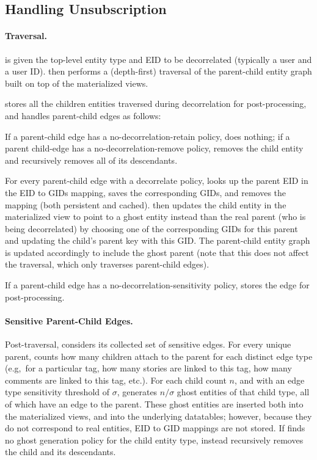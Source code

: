 \subsection{Handling Unsubscription}
\paragraph{Traversal.}
\sys{} is given the top-level entity type and EID to be decorrelated (typically a user and a user ID).
\sys{} then performs a (depth-first) traversal of the parent-child entity graph built on top of the materialized
views. 

\sys{} stores all the children entities traversed during decorrelation for post-processing, and
handles parent-child edges as follows:

If a parent-child edge has a no-decorrelation-retain policy, \sys{} does nothing; if a parent child-edge has a
no-decorrelation-remove policy, \sys{} removes the child entity and recursively removes all of its
descendants. 

For every parent-child edge with a decorrelate policy, \sys{} looks up the parent EID in the
EID to GIDs mapping, saves the corresponding GIDs, and removes the mapping (both persistent and
cached).
\sys{} then updates the child entity in the materialized view to point to a ghost entity instead
than the real parent (who is being decorrelated) by choosing one of the corresponding GIDs for this
parent and updating the child's parent key with this GID.  The parent-child entity graph is updated
accordingly to include the ghost parent (note that this does not affect the traversal, which only
traverses parent-child edges).

If a parent-child edge has a no-decorrelation-sensitivity policy, \sys{} stores the edge for
post-processing.

\paragraph{Sensitive Parent-Child Edges.}
Post-traversal, \sys{} considers its collected set of sensitive edges. For every unique parent,
\sys{} counts how many children attach to the parent for each distinct edge type (e.g,\ for a
particular tag, how many stories are linked to this tag, how many comments are linked to this tag,
etc.). For each child count $n$, and with an edge type sensitivity threshold of $\sigma$, 
\sys{} generates $n / \sigma$ ghost entities of that child type, all of which have an edge to the parent.
These ghost entities are inserted both into the materialized views, and into the underlying
datatables; however, because they do not correspond to real entities, EID to GID mappings are not
stored. 
If \sys{} finds no ghost generation policy for the child entity type, \sys{} instead recursively
removes the child and its descendants.

